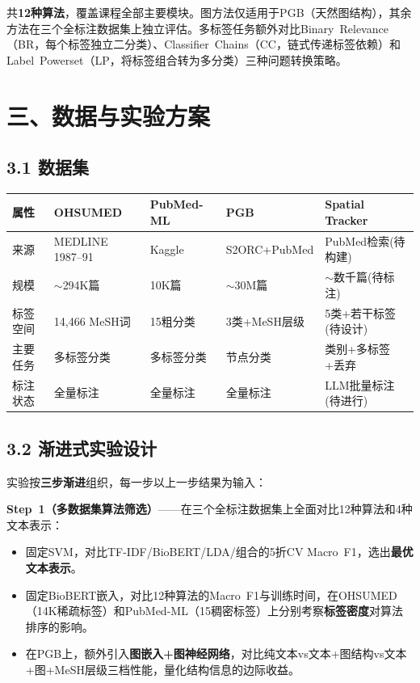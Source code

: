 \documentclass[12pt,a4paper]{ctexart}
\begin{document}
共\textbf{12种算法}，覆盖课程全部主要模块。图方法仅适用于PGB（天然图结构），其余方法在三个全标注数据集上独立评估。多标签任务额外对比Binary~Relevance（BR，每个标签独立二分类）、Classifier~Chains（CC，链式传递标签依赖）和Label~Powerset（LP，将标签组合转为多分类）三种问题转换策略。

\section{三、数据与实验方案}

\subsection*{3.1 数据集}

\vspace{-2pt}
{\footnotesize
\begin{tabular}{@{}p{2.1cm}p{2.8cm}p{2.5cm}p{2.5cm}p{2.8cm}@{}}
\toprule
\textbf{属性} & \textbf{OHSUMED} & \textbf{PubMed-ML} & \textbf{PGB} & \textbf{Spatial Tracker} \\
\midrule
来源 & MEDLINE 1987--91 & Kaggle & S2ORC+PubMed & PubMed检索(待构建) \\
规模 & $\sim$294K篇 & 10K篇 & $\sim$30M篇 & $\sim$数千篇(待标注) \\
标签空间 & 14,466 MeSH词 & 15粗分类 & 3类+MeSH层级 & 5类+若干标签(待设计) \\
主要任务 & 多标签分类 & 多标签分类 & 节点分类 & 类别+多标签+丢弃 \\
标注状态 & 全量标注 & 全量标注 & 全量标注 & LLM批量标注(待进行) \\
\bottomrule
\end{tabular}\par}
\vspace{2pt}

\subsection*{3.2 渐进式实验设计}

实验按\textbf{三步渐进}组织，每一步以上一步结果为输入：

\textbf{Step~1（多数据集算法筛选）}——在三个全标注数据集上全面对比12种算法和4种文本表示：
\begin{itemize}
  \setlength{\itemsep}{-2pt}\setlength{\parsep}{0pt}
  \item 固定SVM，对比TF-IDF/BioBERT/LDA/组合的5折CV Macro~F1，选出\textbf{最优文本表示}。
  \item 固定BioBERT嵌入，对比12种算法的Macro~F1与训练时间，在OHSUMED（14K稀疏标签）和PubMed-ML（15稠密标签）上分别考察\textbf{标签密度}对算法排序的影响。
  \item 在PGB上，额外引入\textbf{图嵌入+图神经网络}，对比纯文本vs文本+图结构vs文本+图+MeSH层级三档性能，量化结构信息的边际收益。
\end{itemize}
\end{document}
